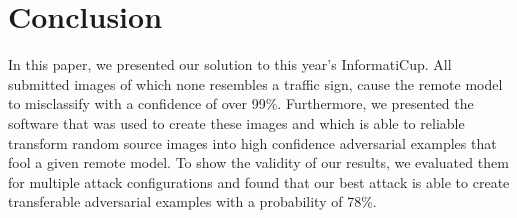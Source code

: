\section{Conclusion}\label{sec:conclusion}

In this paper, we presented our solution to this year's InformatiCup. 
All submitted images of which none resembles a traffic sign, cause the remote model to misclassify with a confidence of over 99\%. 
Furthermore, we presented the software that was used to create these images and which is able to reliable transform random source images into high confidence adversarial examples that fool a given remote model. 
To show the validity of our results, we evaluated them for multiple attack configurations and found that our best attack is able to create transferable adversarial examples with a probability of 78\%.
